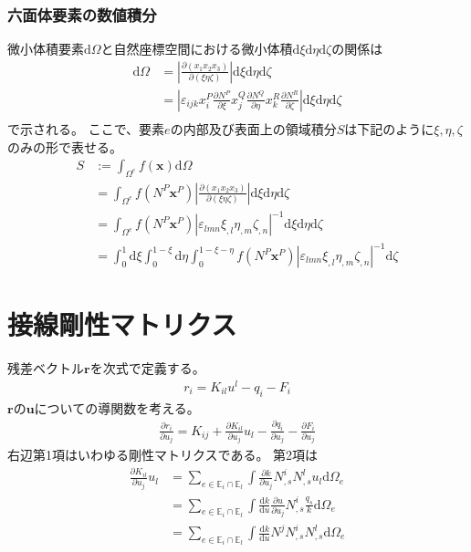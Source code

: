 \documentclass{jarticle}
\begin{document}
\subsubsection{六面体要素の数値積分}
微小体積要素$\mathrm{d}\Omega$と自然座標空間における微小体積$\mathrm{d}\xi\mathrm{d}\eta\mathrm{d}\zeta$の関係は
\begin{align}
  \mathrm{d}\Omega
  &= \left|\frac{\partial (x_1x_2x_3)}{\partial (\xi\eta\zeta)}\right|\mathrm{d}\xi\mathrm{d}\eta\mathrm{d}\zeta\\
  &= \left|\varepsilon_{ijk}x^{P}_{i}\frac{\partial N^P}{\partial \xi}x^{Q}_{j}\frac{\partial N^Q}{\partial \eta}x^{R}_{k}\frac{\partial N^R}{\partial \zeta}\right|\mathrm{d}\xi\mathrm{d}\eta\mathrm{d}\zeta\\
\end{align}
で示される。
ここで、要素$e$の内部及び表面上の領域積分$S$は下記のように$\xi, \eta, \zeta$のみの形で表せる。
\begin{align}
  S&:=\int_{\Omega^e}f(\bm{x})\mathrm{d}\Omega\\
  &=\int_{\Omega^e}f(N^P\bm{x}^P)\left|\frac{\partial (x_1x_2x_3)}{\partial (\xi\eta\zeta)}\right|\mathrm{d}\xi\mathrm{d}\eta\mathrm{d}\zeta\\
  &=\int_{\Omega^e}f(N^P\bm{x}^P)\left|\varepsilon_{lmn}\xi_{,l}\eta_{,m}\zeta_{,n}\right|^{-1}\mathrm{d}\xi\mathrm{d}\eta\mathrm{d}\zeta  \\
  &=\int_{0}^1\mathrm{d}\xi\int_{0}^{1-\xi}\mathrm{d}\eta\int_{0}^{1-\xi-\eta}f(N^P\bm{x}^P)\left|\varepsilon_{lmn}\xi_{,l}\eta_{,m}\zeta_{,n}\right|^{-1}\mathrm{d}\zeta 
\end{align}
\section{接線剛性マトリクス}
残差ベクトル$\bm{r}$を次式で定義する。
\begin{align}
  r_{i} = K_{il}u^{l} - q_{i} - F_i
\end{align}
$\bm{r}$の$\bm{u}$についての導関数を考える。
\begin{align}
  \frac{\partial r_i}{\partial u_j} = K_{ij} + \frac{\partial K_{il}}{\partial u_{j}}u_l -  \frac{\partial q_i}{\partial u_j} -  \frac{\partial F_i}{\partial u_j}
\end{align}
右辺第1項はいわゆる剛性マトリクスである。
第2項は
\begin{align}
  \frac{\partial K_{il}}{\partial u_{j}}u_l
  &= \sum_{e \in \mathbb{E}_i\cap\mathbb{E}_l} \int \frac{\partial k}{\partial u_{j}}N^i_{,s}N^l_{,s}u_l\mathrm{d}\Omega_e\\
  &= \sum_{e \in \mathbb{E}_i\cap\mathbb{E}_l} \int \frac{\mathrm{d} k}{\mathrm{d} u}\frac{\partial u}{\partial u_j}N^i_{,s}\frac{q_s}{k}\mathrm{d}\Omega_e\\
  &= \sum_{e \in \mathbb{E}_i\cap\mathbb{E}_l} \int \frac{\mathrm{d} k}{\mathrm{d} u}N^jN^i_{,s}N^l_{,s}\mathrm{d}\Omega_e
\end{align}
\end{document}
